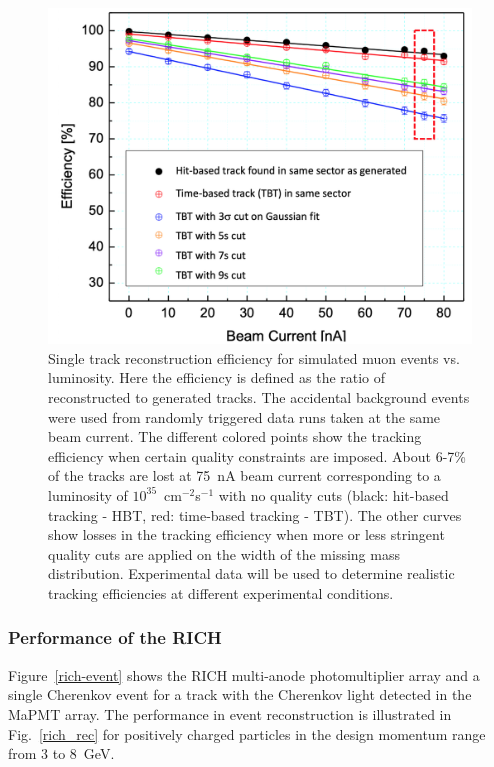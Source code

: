 \documentclass[final,3p]{elsarticle}
\begin{document}
\begin{twocolumn}
\begin{figure}[t!]
\centerline{\includegraphics[width=1.0\columnwidth]{efficiencies.png}}
\caption{Single track reconstruction efficiency for simulated muon events vs. luminosity. Here the efficiency is defined
  as the ratio of reconstructed to generated tracks. The accidental background events were used from randomly
  triggered data runs taken at the same beam current. The different colored points show the tracking efficiency when
  certain quality constraints are imposed. About 6-7\% of the tracks are lost at 75~nA beam current corresponding to a
  luminosity of $10^{35}$~cm$^{-2}$s$^{-1}$ with no quality cuts (black: hit-based tracking - HBT, red: time-based tracking
  - TBT). The other curves show losses in the tracking efficiency when more or less stringent quality cuts are applied on
  the width of the missing mass distribution. Experimental data will be used to determine realistic tracking efficiencies
  at different experimental conditions.}
\label{efficiencies}
\end{figure}

\subsubsection{Performance of the RICH} 

Figure~\ref{rich-event} shows the RICH multi-anode photomultiplier array and a single Cherenkov event for a track
with the Cherenkov light detected in the MaPMT array.  The performance in event reconstruction is illustrated in
Fig.~\ref{rich_rec} for positively charged particles in the design momentum range from 3 to 8~GeV. 


\end{twocolumn}
\end{document}
